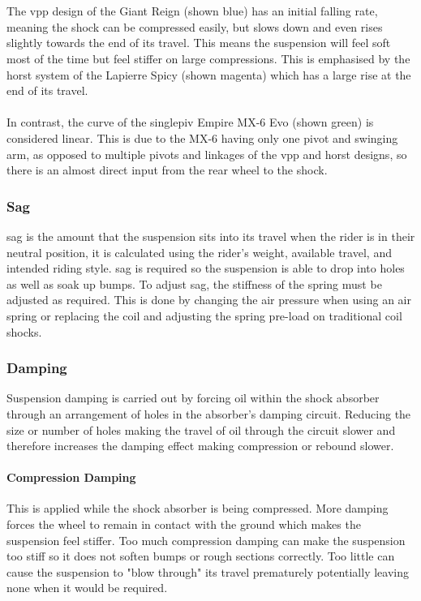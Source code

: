 \documentclass[a4paper, 12pt, hidelinks]{article}
\begin{document}
		\\\\
		The \gls{vpp} design of the Giant Reign (shown blue) has an initial falling rate, meaning the \gls{shock} can be compressed easily, but slows down and even rises slightly towards the end of its travel. This means the suspension will feel soft most of the time but feel stiffer on large compressions. This is emphasised by the \gls{horst} system of the Lapierre Spicy (shown magenta) which has a large rise at the end of its travel.
		\\\\
		In contrast, the curve of the \gls{singlepiv} Empire MX-6 Evo (shown green) is considered linear. This is due to the MX-6 having only one pivot and swinging arm, as opposed to multiple pivots and linkages of the \gls{vpp} and \gls{horst} designs, so there is an almost direct input from the rear wheel to the \gls{shock}.
	\subsubsection{Sag}
		\Gls{sag} is the amount that the suspension sits into its travel when the rider is in their neutral position, it is calculated using the rider's weight, available \gls{travel}, and intended riding style. \Gls{sag} is required so the suspension is able to drop into holes as well as soak up bumps. To adjust \gls{sag}, the stiffness of the spring must be adjusted as required. This is done by changing the air pressure when using an air spring or replacing the coil and adjusting the spring pre-load on traditional coil \glspl{shock}.
	\subsubsection{Damping}
		Suspension damping is carried out by forcing oil within the shock absorber through an arrangement of holes in the absorber's damping circuit. Reducing the size or number of holes making the travel of oil through the circuit slower and therefore increases the damping effect making compression or rebound slower.
	\paragraph{Compression Damping} 
		This is applied while the shock absorber is being compressed. More damping forces the wheel to remain in contact with the ground which makes the suspension feel stiffer. Too much compression damping can make the suspension too stiff so it does not soften bumps or rough sections correctly. Too little can cause the suspension to "blow through" its travel prematurely potentially leaving none when it would be required.
\end{document}
